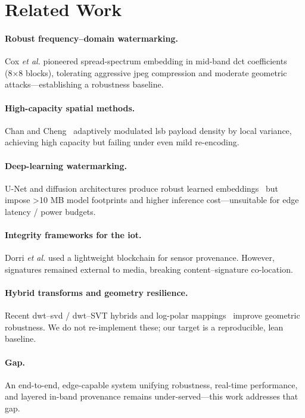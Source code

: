 \section{Related Work}
\label{sec:deep_dive:related}

\paragraph{Robust frequency–domain watermarking.} Cox \emph{et al.} \cite{cox1997secure} pioneered spread-spectrum embedding in mid-band \gls{dct} coefficients (8×8 blocks), tolerating aggressive \gls{jpeg} compression and moderate geometric attacks—establishing a robustness baseline.

\paragraph{High-capacity spatial methods.} Chan and Cheng~\cite{chan2004hiding} adaptively modulated \gls{lsb} payload density by local variance, achieving high capacity but failing under even mild re-encoding.

\paragraph{Deep-learning watermarking.} U-Net and diffusion architectures produce robust learned embeddings~\cite{zhang2020robust} but impose >10 MB model footprints and higher inference cost—unsuitable for edge latency / power budgets.

\paragraph{Integrity frameworks for the \gls{iot}.} Dorri \emph{et al.} \cite{dorri2017blockchain} used a lightweight blockchain for sensor provenance.
However, signatures remained external to media, breaking content–signature co-location.

\paragraph{Hybrid transforms and geometry resilience.} Recent \gls{dwt}–\gls{svd} / \gls{dwt}–SVT hybrids and log-polar mappings~\cite{foo2021dwt,bar2022svt} improve geometric robustness.
We do not re-implement these; our target is a reproducible, lean baseline.

\paragraph{Gap.} An end-to-end, edge-capable system unifying robustness, real-time performance, and layered in-band provenance remains under-served—this work addresses that gap.

